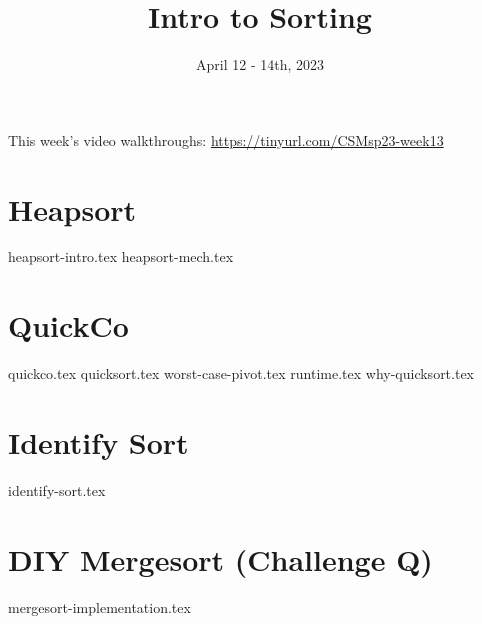 \documentclass[11pt]{exam}
\title{Intro to Sorting} %
\date{April 12 - 14th, 2023}
\begin{document}
\maketitle
This week's video walkthroughs:
\href{https://tinyurl.com/CSMsp23-week13}{https://tinyurl.com/CSMsp23-week13}


\section{Heapsort}
\begin{questions}
{heapsort-intro.tex}
{heapsort-mech.tex}
\end{questions}

\pagebreak

\section{QuickCo}
\begin{questions}
{quickco.tex}
{quicksort.tex}
\vspace{30mm}
{worst-case-pivot.tex}
{runtime.tex}
{why-quicksort.tex}
\end{questions}

\pagebreak
\section{Identify Sort}
\begin{questions}
{identify-sort.tex}
\end{questions}


\pagebreak
\section{DIY Mergesort (Challenge Q)}
\begin{questions}
{mergesort-implementation.tex}
\end{questions} 
\end{document}
